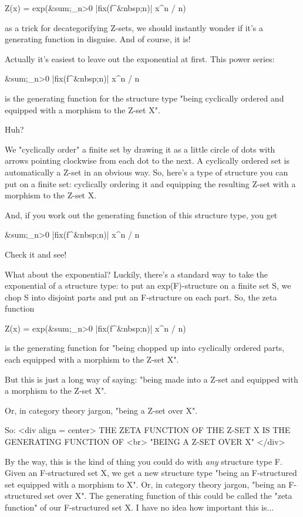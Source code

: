 Z(x) = exp(&sum;_{n>0} |fix(f^{&nbsp;n})| x^{n} / n)

as a trick for decategorifying Z-sets, we should instantly wonder if it's 
a generating function in disguise.  And of course, it is!

Actually it's easiest to leave out the exponential at first.  This power
series:

&sum;_{n>0} |fix(f^{&nbsp;n})| x^{n} / n

is the generating function for the structure type "being cyclically 
ordered and equipped with a morphism to the Z-set X".   

Huh?

We "cyclically order" a finite set by drawing it as a little circle of dots 
with arrows pointing clockwise from each dot to the next.  A cyclically 
ordered set is automatically a Z-set in an obvious way.   So, here's a type 
of structure you can put on a finite set: cyclically ordering it and 
equipping the resulting Z-set with a morphism to the Z-set X.  

And, if you work out the generating function of this structure type, you get 

&sum;_{n>0} |fix(f^{&nbsp;n})| x^{n} / n

Check it and see!  

What about the exponential?  Luckily, there's a standard way to take the 
exponential of a structure type: to put an exp(F)-structure on a finite set 
S, we chop S into disjoint parts and put an F-structure on each part.  So, 
the zeta function

Z(x) = exp(&sum;_{n>0} |fix(f^{&nbsp;n})| x^{n} / n)

is the generating function for "being chopped up into cyclically ordered 
parts, each equipped with a morphism to the Z-set X". 

But this is just a long way of saying: "being made into a Z-set
and equipped with a morphism to the Z-set X".

Or, in category theory jargon, "being a Z-set over X".

So: 
<div align = center>
     THE ZETA FUNCTION OF THE Z-SET X IS THE GENERATING FUNCTION OF <br>
                      "BEING A Z-SET OVER X"
</div>

By the way, this is the kind of thing you could do with \emph{any}
structure type F.  Given an F-structured set X, we get a new structure
type "being an F-structured set equipped with a morphism to
X".  Or, in category theory jargon, "being an F-structured
set over X".  The generating function of this could be called the
"zeta function" of our F-structured set X.  I have no idea
how important this is...

